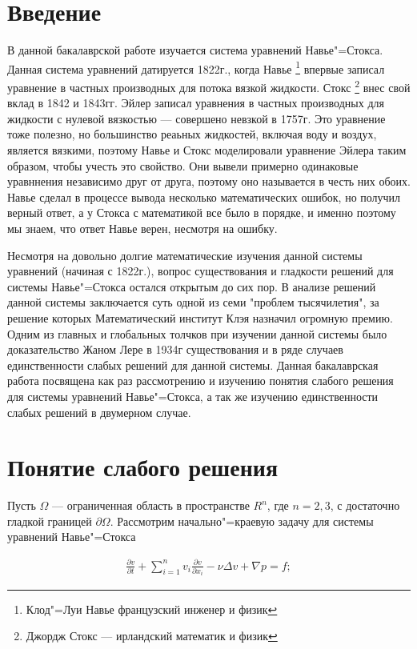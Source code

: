 \section*{Введение}
В данной бакалаврской работе изучается система уравнений Навье"=Стокса. Данная система уравнений датируется 1822г., когда 
Навье \footnote{Клод"=Луи Навье французский инженер и физик} впервые записал уравнение в частных производных для потока 
вязкой жидкости. Стокс \footnote{Джордж Стокс --- ирландский математик и физик} внес свой вклад в 1842 и 1843гг. Эйлер 
записал уравнения в частных производных для жидкости с нулевой вязкостью --- совершено невзкой в 1757г. Это уравнение 
тоже полезно, но большинство реаьных жидкостей, включая воду и воздух, является вязкими, поэтому Навье и Стокс 
моделировали уравнение Эйлера таким образом, чтобы учесть это свойство. Они вывели примерно одинаковые уравннения независимо
друг от друга, поэтому оно называется в честь них обоих. Навье сделал в процессе вывода несколько математических ошибок, но
получил верный ответ, а у Стокса с математикой все было в порядке, и именно поэтому мы знаем, что ответ Навье верен, несмотря 
на ошибку.

Несмотря на довольно долгие математические изучения данной системы уравнений (начиная с 1822г.), вопрос существования и 
гладкости решений для системы Навье"=Стокса остался открытым до сих пор. В анализе решений данной системы заключается суть 
одной из семи "проблем тысячилетия", за решение которых Математический институт Клэя назначил огромную премию. Одним из 
главных и глобальных толчков при изучении данной системы было доказательство Жаном Лере в 1934г существования и в ряде 
случаев единственности слабых решений для данной системы. Данная бакалаврская работа посвящена как раз рассмотрению и
изучению понятия слабого решения для системы уравнений Навье"=Стокса, а так же изучению единственности слабых решений 
в двумерном случае.
\clearpage

\section {Понятие слабого решения}
Пусть $\Omega$ --- ограниченная область в пространстве $R^n$, где $n=2, 3$, с достаточно гладкой границей $\partial\Omega$.
Рассмотрим начально"=краевую задачу для системы уравнений Навье"=Стокса

\begin{equation}\label{eq:5.1}
    \begin{gathered}
        \frac{\partial v}{\partial t}+\sum_{i=1}^nv_i\frac{\partial v}{\partial x_i}-\nu\Delta v+\nabla p=f;
    \end{gathered}
\end{equation}

